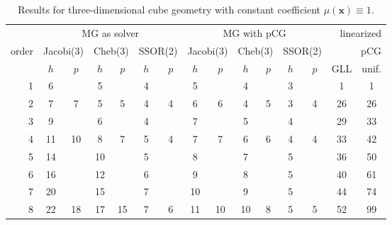 \documentclass[smallcondensed,final]{svjour3}     %
\newcommand{\bs}[1]{\ensuremath{\boldsymbol #1}}
\begin{document}
\begin{table}
  \caption{\label{tab:3d-box} Results for three-dimensional cube geometry
    with constant coefficient $\mu(\bs x) \equiv 1$.}
  \centering
  \begin{tabular}{|r|c c|c c|c c||c c|c c|c c||c c|} 
    \hline
    & \multicolumn{6}{c||}{MG as solver} & \multicolumn{6}{c||}{MG with pCG} & \multicolumn{2}{r|}{linearized} \\
    \cline{2-13}
    \!\!\! order \!\!\!\! &  \multicolumn{2}{c|}{\!\scriptsize  Jacobi(3)\!} &  \multicolumn{2}{c|}{\!\scriptsize Cheb(3)\!} & \multicolumn{2}{c||}{\!\scriptsize  SSOR(2)\!} & \multicolumn{2}{c|}{\!\scriptsize Jacobi(3)\!} &  \multicolumn{2}{c|}{\!\scriptsize Cheb(3)\!} & \multicolumn{2}{c||}{\!\scriptsize SSOR(2)\!} & \multicolumn{2}{r|}{pCG}\\
\hline
 & $h$ & $p$ & $h$ & $p$& $h$ & $p$& $h$ & $p$& $h$ & $p$& $h$ & $p$& GLL & unif.\\
 \cline{2-15}
1 & 6 & & 5 & & 4 & & 5 & & 4 & & 3 & & 1 & 1  \\
2 & 7 & 7 & 5 & 5 & 4 & 4 & 6 & 6 & 4 & 5 & 3 & 4 & 26 & 26 \\
3 & 9 & & 6 & & 4 & & 7 & & 5 & & 4 & & 29 & 33  \\
4 & 11 & 10 & 8 & 7 & 5 & 4 & 7 & 7 & 6 & 6 & 4 & 4 & 33 & 42 \\
5 & 14 & & 10 & & 5 & & 8 & & 7 & & 5 & & 36 & 50  \\
6 & 16 & & 12 & & 6 & & 9 & & 8 & & 5 & & 40 & 61  \\
7 & 20 & & 15 & & 7 & & 10 & & 9 & & 5 & & 44 & 74  \\
8 & 22 & 18 & 17 & 15 & 7 & 6 & 11 & 10 & 10 & 8 & 5 & 5 & 52 & 99 \\
\hline
  \end{tabular}
\end{table}
\end{document}
